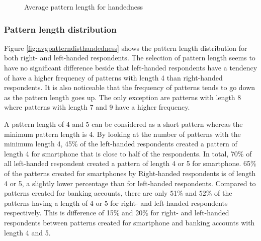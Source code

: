       \begin{figure}[H]
      	\centering
      	\caption{Average pattern length for handedness}
      	\label{fig:avgpatternlengthhandedness}
      \end{figure}

    \subsubsection{Pattern length distribution}
      Figure \ref{fig:avgpatterndisthandedness} shows the pattern length distribution for both right- and left-handed respondents. The selection of pattern length seems to have no significant difference beside that left-handed respondents have a tendency of have a higher frequency of patterns with length 4 than right-handed respondents. 
      It is also noticeable that the frequency of patterns tends to go down as the pattern length goes up. The only exception are patterns with length 8 where patterns with length 7 and 9 have a higher frequency.

      A pattern length of 4 and 5 can be considered as a short pattern whereas the minimum pattern length is 4. By looking at the number of patterns with the minimum length 4, 45\% of the left-handed respondents created a pattern of length 4 for smartphone that is close to half of the respondents. In total, 70\% of all left-handed respondent created a pattern of length 4 or 5 for smartphone. 65\% of the patterns created for smartphones by Right-handed respondents is of length 4 or 5, a slightly lower percentage than for left-handed respondents. Compared to patterns created for banking accounts, there are only 51\% and 52\% of the patterns having a length of 4 or 5 for right- and left-handed respondents respectively. This is difference of 15\% and 20\% for right- and left-handed respondents between patterns created for smartphone and banking accounts with length 4 and 5.  

